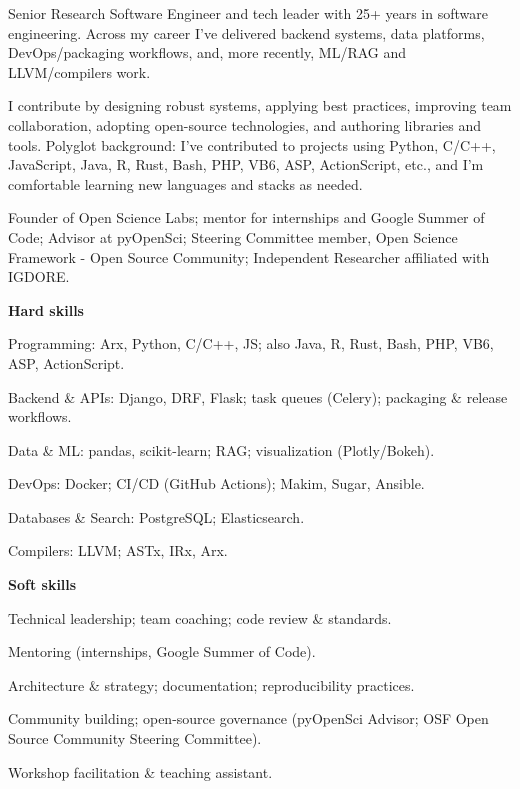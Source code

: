 \documentclass[10pt,a4paper]{article}
\begin{document}
\StartCVColumns


\small
Senior Research Software Engineer and tech leader with 25+ years in software engineering. Across my career I've delivered backend systems, data platforms, DevOps/packaging workflows, and, more recently, ML/RAG and LLVM/compilers work.

I contribute by designing robust systems, applying best practices, improving team collaboration, adopting open-source technologies, and authoring libraries and tools. Polyglot background: I've contributed to projects using Python, C/C++, JavaScript, Java, R, Rust, Bash, PHP, VB6, ASP, ActionScript, etc., and I'm comfortable learning new languages and stacks as needed.

Founder of Open Science Labs; mentor for internships and Google Summer of Code; Advisor at pyOpenSci; Steering Committee member, Open Science Framework - Open Source Community; Independent Researcher affiliated with IGDORE.
\normalsize


\small
\textbf{Hard skills}
\begin{tightitemize}
  \item Programming: Arx, Python, C/C++, JS; also Java, R, Rust, Bash, PHP, VB6, ASP, ActionScript.
  \item Backend \& APIs: Django, DRF, Flask; task queues (Celery); packaging \& release workflows.
  \item Data \& ML: pandas, scikit-learn; RAG; visualization (Plotly/Bokeh).
  \item DevOps: Docker; CI/CD (GitHub Actions); Makim, Sugar, Ansible.
  \item Databases \& Search: PostgreSQL; Elasticsearch.
  \item Compilers: LLVM; ASTx, IRx, Arx.
\end{tightitemize}

\textbf{Soft skills}
\begin{tightitemize}
  \item Technical leadership; team coaching; code review \& standards.
  \item Mentoring (internships, Google Summer of Code).
  \item Architecture \& strategy; documentation; reproducibility practices.
  \item Community building; open-source governance (pyOpenSci Advisor; OSF Open Source Community Steering Committee).
  \item Workshop facilitation \& teaching assistant.
\end{tightitemize}
\end{document}
